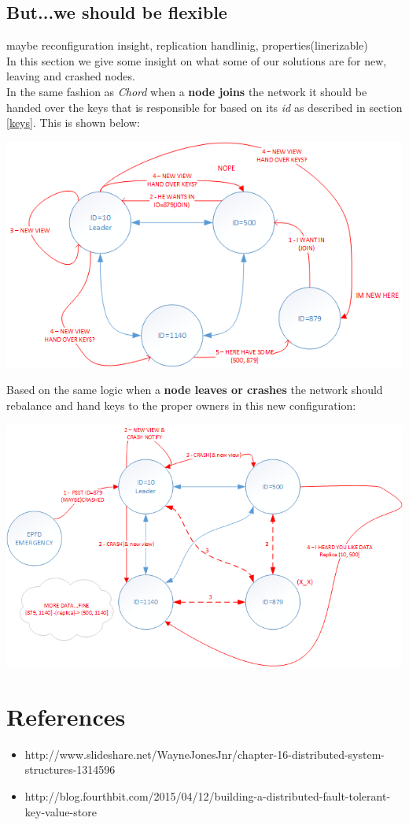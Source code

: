\documentclass[a4paper, 11pt]{article}
\begin{document}
\subsection{But...we should be flexible}

\noindent maybe reconfiguration insight, replication handlinig, properties(linerizable) \\

\noindent In this section we give some insight on what some of our solutions are for new, leaving and crashed nodes. \\
\noindent In the same fashion as \textit{Chord} when a \textbf{node joins} the network it should be handed over the keys that is responsible for based on its \textit{id} as described in section \ref{keys}. This is shown below:

{\centering\includegraphics[scale = 0.90]{./figures/nodejoin.png}\par}

\clearpage

\noindent Based on the same logic when a \textbf{node leaves or crashes} the network should rebalance and hand keys to the proper owners in this new configuration:

{\centering\includegraphics[scale = 0.87]{./figures/nodecrash.png}\par}

\section{References}
\begin{itemize}
	\item http://www.slideshare.net/WayneJonesJnr/chapter-16-distributed-system-structures-1314596
	\item 
	http://blog.fourthbit.com/2015/04/12/building-a-distributed-fault-tolerant-key-value-store
\end{itemize}
\end{document}
